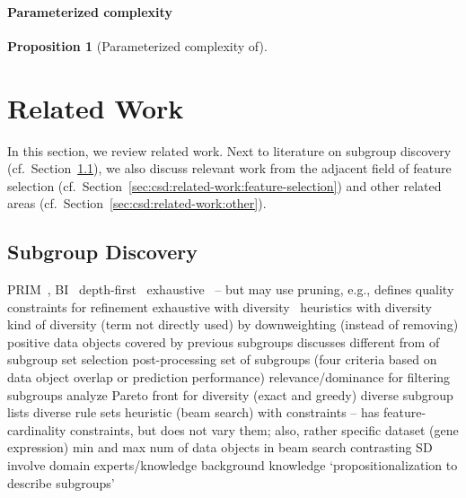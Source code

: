 \documentclass{article}
\newtheorem{proposition}{Proposition}
\theoremstyle{definition}
\begin{document}
\paragraph{Parameterized complexity}

\begin{proposition}[Parameterized complexity of]
	\label{prop:csd:complexity-alternatives-xp}
\end{proposition}

\section{Related Work}
\label{sec:csd:related-work}

In this section, we review related work.
Next to literature on subgroup discovery (cf.~Section~\ref{sec:csd:related-work:subgroup-discovery}), we also discuss relevant work from the adjacent field of feature selection (cf.~Section~\ref{sec:csd:related-work:feature-selection}) and other related areas (cf.~Section~\ref{sec:csd:related-work:other}).

\subsection{Subgroup Discovery}
\label{sec:csd:related-work:subgroup-discovery}

PRIM~\cite{friedman1999bump}, BI~\cite{mampaey2012efficient}
depth-first~\cite{millot2020optimal}
exhaustive~\cite{atzmueller2006sd, atzmueller2009fast, grosskreutz2009subgroup, lemmerich2016fast} -- but may use pruning, e.g., \cite{grosskreutz2009subgroup} defines quality constraints for refinement
exhaustive with diversity~\cite{bosc2018anytime, lemmerich2010fast}
heuristics with diversity \cite{leeuwen2012diverse, lucas2018ssdp+, proencca2022robust}
kind of diversity (term not directly used) by downweighting (instead of removing) positive data objects covered by previous subgroups \cite{lavrac2004subgroup}
\cite{atzmueller2015subgroup} discusses different from of subgroup set selection
post-processing set of subgroups (four criteria based on data object overlap or prediction performance) \cite{knobbe2006pattern}
relevance/dominance for filtering subgroups \cite{grosskreutz2012enhanced}
analyze Pareto front for diversity (exact and greedy) \cite{leeuwen2013discovering}
diverse subgroup lists \cite{lopez2023discovering, lopez2023novel}
diverse rule sets \cite{zhang2020diverse}
heuristic (beam search) with constraints \cite{lavravc2006relevancy} -- has feature-cardinality constraints, but does not vary them; also, rather specific dataset (gene expression)
min and max num of data objects in beam search \cite{meeng2021real}
contrasting SD \cite{langohr2013contrasting}
involve domain experts/knowledge \cite{dzyuba2013interactive, gamberger2002expert, lemmerich2011local}
background knowledge \cite{atzmueller2005exploiting, atzmueller2006methodological}
`propositionalization to describe subgroups' \cite{zelezny2006propositionalization}
\end{document}
